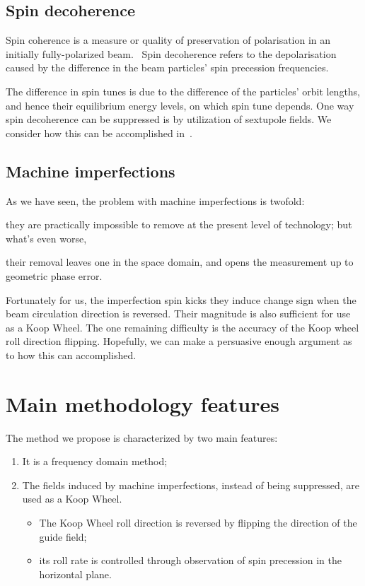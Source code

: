 \documentclass[]{elsarticle}
\begin{document}
\subsection{Spin decoherence}
Spin coherence is a measure or quality of preservation of polarisation in an initially fully-polarized
beam.~\cite{Eremey:Thesis} Spin decoherence refers to the depolarisation caused by the difference in the
beam particles' spin precession frequencies. 

The difference in spin tunes is due to the difference of the particles' orbit lengths, and hence their
equilibrium energy levels, on which spin tune depends. One way spin decoherence can be suppressed is by
utilization of sextupole fields. We consider how this can be accomplished in~\cite{Aksentev:IPAC19:Decoh}.

\subsection{Machine imperfections}

As we have seen, the problem with machine imperfections is twofold:
\begin{enumerate*}%
\item they are practically impossible to remove at the present level of technology; but what's even worse, 
\item their removal leaves one in the space domain, and opens the measurement up to geometric phase error.
\end{enumerate*}

Fortunately for us, the imperfection spin kicks they induce change sign when the beam circulation direction
is reversed. Their magnitude is also sufficient for use as a Koop Wheel. The one remaining difficulty
is the accuracy of the Koop wheel roll direction flipping. Hopefully, we can make a persuasive
enough argument as to how this can accomplished.

\section{Main methodology features}

The method we propose is characterized by two main features:
\begin{enumerate}
\item It is a frequency domain method;
\item The fields induced by machine imperfections, instead of being suppressed,
  are used as a Koop Wheel.
  \begin{itemize}
  \item The Koop Wheel roll direction is reversed by flipping the direction of the guide field;
  \item its roll rate is controlled through observation of spin precession in the horizontal plane.
  \end{itemize}
\end{enumerate}
\end{document}
